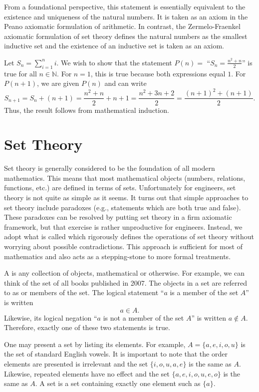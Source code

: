 From a foundational perspective, this statement is essentially equivalent to the existence and uniqueness of the natural numbers.
It is taken as an axiom in the Peano axiomatic formulation of arithmetic.
In contrast, the Zermelo-Fraenkel axiomatic formulation of set theory defines the natural numbers as the smallest inductive set and the existence of an inductive set is taken as an axiom.

\begin{example}
Let $S_n = \sum_{i=1}^n i$.
We wish to show that the statement $P(n)=$ ``$S_n = \frac{n^2 + n}{2}$'' is true for all $n\in \mathbb{N}$.
For $n=1$, this is true because both expressions equal $1$.
For $P(n+1)$, we are given $P(n)$ and can write
\[ S_{n+1} = S_n + (n+1) = \frac{n^2 + n}{2} + n+1 = \frac{n^2 + 3n + 2}{2} = \frac{(n+1)^2+(n+1)}{2}. \]
Thus, the result follows from mathematical induction.
\end{example}

\section{Set Theory}

Set theory is generally considered to be the foundation of all modern mathematics.
This means that most mathematical objects (numbers, relations, functions, etc.) are defined in terms of sets.
Unfortunately for engineers, set theory is not quite as simple as it seems.
It turns out that simple approaches to set theory include paradoxes (e.g., statements which are both true and false).
These paradoxes can be resolved by putting set theory in a firm axiomatic framework, but that exercise is rather unproductive for engineers.
Instead, we adopt what is called  which rigorously defines the operations of set theory without worrying about possible contradictions.
This approach is sufficient for most of mathematics and also acts as a stepping-stone to more formal treatments.

A  is any collection of objects, mathematical or otherwise.
For example, we can think of the set of all books published in 2007.
The objects in a set are referred to as  or members of the set.
The logical statement ``$a$ is a member of the set $A$'' is written
\[ a \in A. \]
Likewise, its logical negation ``$a$ is not a member of the set $A$'' is written $a \notin A$.
Therefore, exactly one of these two statements is true.

One may present a set by listing its elements.
For example, $A= \{ a,e,i,o,u \}$ is the set of standard English vowels.
It is important to note that the order elements are presented is irrelevant and the set $\{ i,o,u,a,e \}$ is the same as $A$.
Likewise, repeated elements have no effect and the set $\{ a,e,i,o,u,e,o \}$ is the same as $A$.
A  set is a set containing exactly one element such as $\{a\}$.


